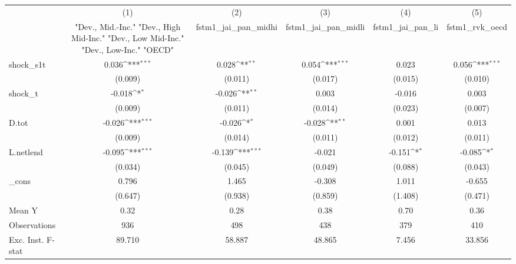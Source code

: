 {
\def\sym#1{\ifmmode^{#1}\else\(^{#1}\)\fi}
\begin{tabular}{l*{5}{c}}
\toprule
            &\multicolumn{1}{c}{(1)}&\multicolumn{1}{c}{(2)}&\multicolumn{1}{c}{(3)}&\multicolumn{1}{c}{(4)}&\multicolumn{1}{c}{(5)}\\
            &\multicolumn{1}{c}{ "Dev., Mid.-Inc." "Dev., High Mid-Inc." "Dev., Low Mid-Inc." "Dev., Low-Inc." "OECD" }&\multicolumn{1}{c}{fstm1\_jai\_pan\_midhi}&\multicolumn{1}{c}{fstm1\_jai\_pan\_midli}&\multicolumn{1}{c}{fstm1\_jai\_pan\_li}&\multicolumn{1}{c}{fstm1\_rvk\_oecd}\\
\midrule
shock\_s1t   &       0.036\sym{***}&       0.028\sym{**} &       0.054\sym{***}&       0.023         &       0.056\sym{***}\\
            &     (0.009)         &     (0.011)         &     (0.017)         &     (0.015)         &     (0.010)         \\
\addlinespace
shock\_t     &      -0.018\sym{*}  &      -0.026\sym{**} &       0.003         &      -0.016         &       0.003         \\
            &     (0.009)         &     (0.011)         &     (0.014)         &     (0.023)         &     (0.007)         \\
\addlinespace
D.tot       &      -0.026\sym{***}&      -0.026\sym{*}  &      -0.028\sym{**} &       0.001         &       0.013         \\
            &     (0.009)         &     (0.014)         &     (0.011)         &     (0.012)         &     (0.011)         \\
\addlinespace
L.netlend   &      -0.095\sym{***}&      -0.139\sym{***}&      -0.021         &      -0.151\sym{*}  &      -0.085\sym{*}  \\
            &     (0.034)         &     (0.045)         &     (0.049)         &     (0.088)         &     (0.043)         \\
\addlinespace
\_cons      &       0.796         &       1.465         &      -0.308         &       1.011         &      -0.655         \\
            &     (0.647)         &     (0.938)         &     (0.859)         &     (1.408)         &     (0.471)         \\
\midrule
Mean Y      &        0.32         &        0.28         &        0.38         &        0.70         &        0.36         \\
Observations&         936         &         498         &         438         &         379         &         410         \\
Exc. Inst. F-stat&      89.710         &      58.887         &      48.865         &       7.456         &      33.856         \\
\bottomrule
\end{tabular}
}
